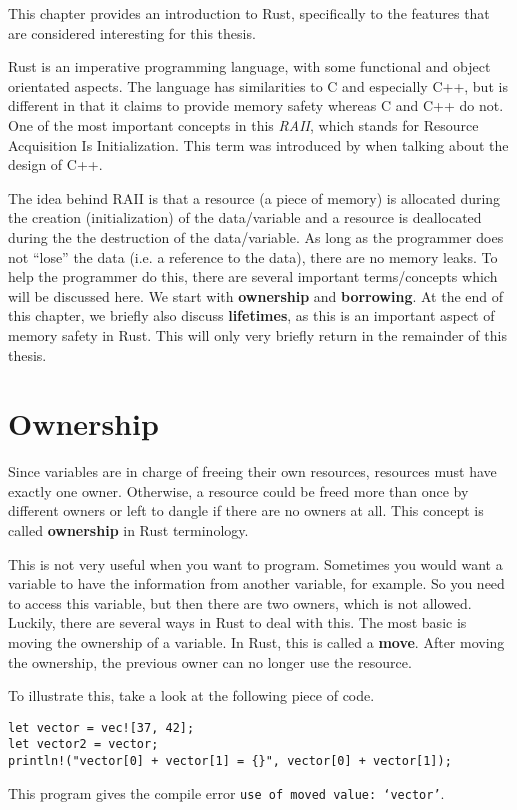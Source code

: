 This chapter provides an introduction to Rust, specifically to the features that are considered interesting for this thesis. 

Rust is an imperative programming language, with some functional and object orientated aspects. The language has similarities to C and especially C++, but is different in that it claims to provide memory safety whereas C and C++ do not. One of the most important concepts in this \emph{RAII}, which stands for Resource Acquisition Is Initialization. This term was introduced by \cite{stroustrup1994design} when talking about the design of C++.

The idea behind RAII is that a resource (a piece of memory) is allocated during the creation (initialization) of the data/variable and a resource is deallocated during the the destruction of the data/variable. As long as the programmer does not ``lose'' the data (i.e. a reference to the data), there are no memory leaks. To help the programmer do this, there are several important terms/concepts which will be discussed here. We start with \textbf{ownership} and \textbf{borrowing}. At the end of this chapter, we briefly also discuss \textbf{lifetimes}, as this is an important aspect of memory safety in Rust. This will only very briefly return in the remainder of this thesis. 

\section{Ownership} %
Since variables are in charge of freeing their own resources, resources must have exactly one owner. Otherwise, a resource could be freed more than once by different owners or left to dangle if there are no owners at all. This concept is called \textbf{ownership} in Rust terminology. 

This is not very useful when you want to program. Sometimes you would want a variable to have the information from another variable, for example. So you need to access this variable, but then there are two owners, which is not allowed. Luckily, there are several ways in Rust to deal with this. The most basic is moving the ownership of a variable. In Rust, this is called a \textbf{move}. After moving the ownership, the previous owner can no longer use the resource. 

To illustrate this, take a look at the following piece of code. 
\begin{verbatim}
let vector = vec![37, 42];
let vector2 = vector;
println!("vector[0] + vector[1] = {}", vector[0] + vector[1]);
\end{verbatim}
This program gives the compile error \texttt{use of moved value: `vector'}. 

